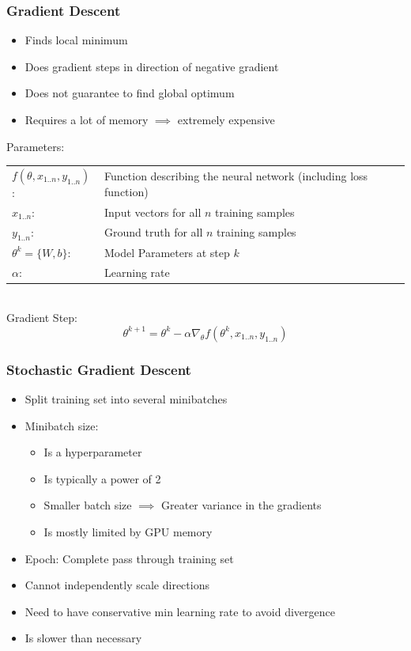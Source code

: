 \documentclass[10pt,a4paper]{article}
\newcommand{\cons}{\textcolor{red}{\textbf{\textendash}}}
\newcommand{\props}{$\circ$}
\newcommand{\iprops}{\item[\props]}
\begin{document}
\subsubsection{Gradient Descent}
\begin{itemize}
	\item Finds local minimum
	\item Does gradient steps in direction of negative gradient
	\iprops Does not guarantee to find global optimum
	\item[\cons] Requires a lot of memory $\implies$ extremely expensive
\end{itemize}

Parameters: \\
\begin{tabular}{ll}
	$f(\theta, x_{1..n}, y_{1..n})$: & Function describing the neural network (including loss function) \\
	$x_{1..n}$: & Input vectors for all $n$ training samples \\
	$y_{1..n}$: & Ground truth for all $n$ training samples \\
	$\theta^k = \{W, b\}$: & Model Parameters at step $k$ \\
	$\alpha$: & Learning rate
\end{tabular} \\

Gradient Step:
$$
	\theta^{k + 1} = \theta^k - \alpha \nabla_\theta f(\theta^k, x_{1..n}, y_{1..n})
$$

\subsubsection{Stochastic Gradient Descent}
\begin{itemize}
	\item Split training set into several minibatches
	\item Minibatch size:
	\begin{itemize}
		\item Is a hyperparameter
		\item Is typically a power of 2
		\item Smaller batch size $\implies$ Greater variance in the gradients
		\item Is mostly limited by GPU memory
	\end{itemize}
	\iprops Epoch: Complete pass through training set
	\item[\cons] Cannot independently scale directions
	\item[\cons] Need to have conservative min learning rate to avoid divergence
	\item[\cons] Is slower than necessary
\end{itemize}
\end{document}
